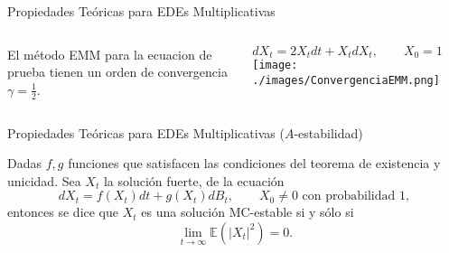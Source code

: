 \begin{bibunit}[aalpha]
\begin{frame}{Propiedades Te\'oricas para EDEs Multiplicativas}
  \begin{columns}
       \begin{exampleblock}{El método EMM para la ecuacion de prueba}
         tienen un orden de convergencia $\gamma=\frac{1}{2}$.
        \cite{Higham01}
       \end{exampleblock}
     \begin{block}{$dX_t=2X_t dt+X_t dX_t, \qquad X_0=1$}
       \texttt{[image: ./images/ConvergenciaEMM.png]}
    \end{block}
   \end{columns}
\end{frame}
\end{bibunit}
\begin{bibunit}[aalpha]
\begin{frame}{Propiedades Te\'oricas para EDEs Multiplicativas ($A$-estabilidad)}
  \begin{Definicion}
    Dadas $f,g$ funciones que satisfacen las condiciones del teorema de
    existencia y unicidad. Sea $X_t$ la soluci\'on fuerte,
    de la ecuación
    $$
    dX_t=f(X_t)dt+g(X_t)dB_t, \qquad X_0\neq 0 \text{ con probabilidad 1},
    $$
    entonces se dice que  $X_t$ es una soluci\'on MC-estable si y s\'olo si
     $$
      \lim _{t\to\infty}\mathbb{E}(|X_t|^2)=0.
     $$\cite{saito1996stability}
  \end{Definicion}
\end{frame}
\end{bibunit}
